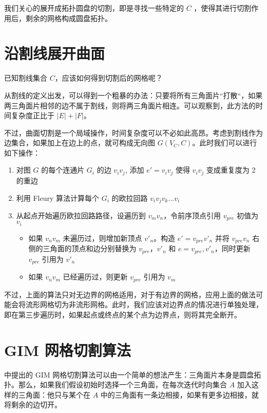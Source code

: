 我们关心的展开成拓扑圆盘的切割，即是寻找一些特定的 $ C $ ，使得其进行切割作用后，剩余的网格构成圆盘拓扑。

\section{沿割线展开曲面}

已知割线集合 $ C $，应该如何得到切割后的网格呢？

从割线的定义出发，可以得到一个粗暴的办法：只要将所有三角面片“打散“，如果两三角面片相邻的边不属于割线，则将两三角面片相连。可以观察到，此方法的时间复杂度正比于 $ | E | + | F | $。

不过，曲面切割是一个局域操作，时间复杂度可以不必如此高昂。考虑到割线作为边集合，如果加上在边上的点，就可构成无向图 $ G(V_C, C) $。此时我们可以进行如下操作：
\begin{enumerate}
  \item 对图 $ G $ 的每个连通片 $ G_i $ 的边 $ v_iv_j $, 添加 $ e' = v_i v_j $ 使得 $ v_i v_j $ 变成重复度为 2 的重边
  \item 利用 Fleury 算法计算每个 $ G_i $ 的欧拉回路 $ v_i v_j v_k ... v_i $
  \item 从起点开始遍历欧拉回路路径，设遍历到 $ v_m v_n $，令前序顶点引用 $ v_{pre} $ 初值为 $ v_i $
        \begin{itemize}
          \item 如果 $ v_n v_m $ 未遍历过，则增加新顶点 $ v'_n $。构造 $ e' = v_{pre} v’_n $ 并将 $ v_{pre} v_n $ 右侧的三角面的顶点和边分别替换为 $ v_{pre} $，$ v'_n $ 和 $ e = v_{pre}, v'_n $，同时更新 $ v_{pre} $ 引用为 $ v'_n $
          \item 如果 $ v_n v_m $ 已经遍历过，则更新 $ v_{pre} $ 引用为 $ v_m $
        \end{itemize}
\end{enumerate}

不过，上面的算法只对无边界的网格适用，对于有边界的网格，应用上面的做法可能会将流形网格切为非流形网格。此时，我们应该对边界点的情况进行单独处理，即在第三步遍历时，如果起点或终点的某个点为边界点，则将其完全断开。

\section{GIM 网格切割算法}

\citet{Gu2002} 中提出的 GIM 网格切割算法可以由一个简单的想法产生：三角面片本身是圆盘拓扑。那么，如果我们假设初始时选择一个三角面，在每次迭代时向集合 $ A $ 加入这样的三角面：他只与某个在 $ A $ 中的三角面有一条边相接，如果有更多边相接，就将剩余的边切开。

